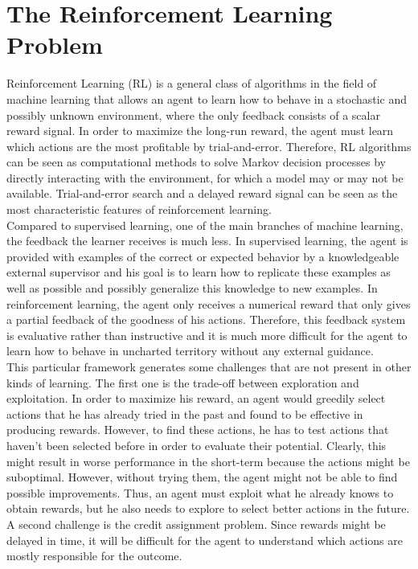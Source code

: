 \section{The Reinforcement Learning Problem}
Reinforcement Learning (RL) is a general class of algorithms in the field of machine learning that allows an agent to learn how to behave in a stochastic and possibly unknown environment, where the only feedback consists of a scalar reward signal. In order to maximize the long-run reward, the agent must learn which actions are the most profitable by trial-and-error. Therefore, RL algorithms can be seen as computational methods to solve Markov decision processes by directly interacting with the environment, for which a model may or may not be available. Trial-and-error search and a delayed reward signal can be seen as the most characteristic features of reinforcement learning.\\
Compared to supervised learning, one of the main branches of machine learning, the feedback the learner receives is much less. In supervised learning, the agent is provided with examples of the correct or expected behavior by a knowledgeable external supervisor and his goal is to learn how to replicate these examples as well as possible and possibly generalize this knowledge to new examples. In reinforcement learning, the agent only receives a numerical reward that only gives a partial feedback of the goodness of his actions. Therefore, this feedback system is evaluative rather than instructive and it is much more difficult for the agent to learn how to behave in uncharted territory without any external guidance.\\ 
This particular framework generates some challenges that are not present in other kinds of learning. The first one is the trade-off between exploration and exploitation. In order to maximize his reward, an agent would greedily select actions that he has already tried in the past and found to be effective in producing rewards. However, to find these actions, he has to test actions that haven't been selected before in order to evaluate their potential. Clearly, this might result in worse performance in the short-term because the actions might be suboptimal. However, without trying them, the agent might not be able to find possible improvements. Thus, an agent must exploit what he already knows to obtain rewards, but he also needs to explore to select better actions in the future. A second challenge is the credit assignment problem. Since rewards might be delayed in time, it will be difficult for the agent to understand which actions are mostly responsible for the outcome. 

